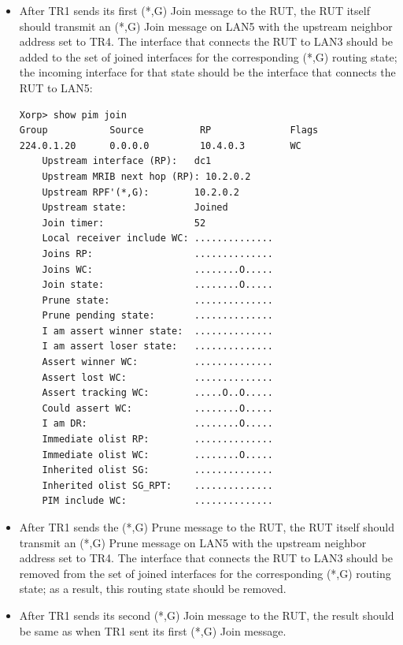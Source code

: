 \documentclass[11pt]{report}
\begin{document}


\begin{itemize}

  \item After TR1 sends its first (*,G) Join message to the RUT, the RUT
  itself should transmit an (*,G) Join message on LAN5 with the upstream
  neighbor address set to TR4. The interface that connects the RUT to LAN3
  should be added to the set of joined interfaces for the corresponding
  (*,G) routing state; the incoming interface for that state should be the
  interface that connects the RUT to LAN5:

\begin{verbatim}
Xorp> show pim join
Group           Source          RP              Flags
224.0.1.20      0.0.0.0         10.4.0.3        WC   
    Upstream interface (RP):   dc1
    Upstream MRIB next hop (RP): 10.2.0.2
    Upstream RPF'(*,G):        10.2.0.2
    Upstream state:            Joined 
    Join timer:                52
    Local receiver include WC: ..............
    Joins RP:                  ..............
    Joins WC:                  ........O.....
    Join state:                ........O.....
    Prune state:               ..............
    Prune pending state:       ..............
    I am assert winner state:  ..............
    I am assert loser state:   ..............
    Assert winner WC:          ..............
    Assert lost WC:            ..............
    Assert tracking WC:        .....O..O.....
    Could assert WC:           ........O.....
    I am DR:                   ........O.....
    Immediate olist RP:        ..............
    Immediate olist WC:        ........O.....
    Inherited olist SG:        ..............
    Inherited olist SG_RPT:    ..............
    PIM include WC:            ..............
\end{verbatim}

  \item After TR1 sends the (*,G) Prune message to the RUT, the RUT itself
  should transmit an (*,G) Prune message on LAN5 with the upstream neighbor
  address set to TR4. The interface that connects the RUT to LAN3 should be
  removed from the set of joined interfaces for the corresponding (*,G)
  routing state; as a result, this routing state should be removed.

  \item After TR1 sends its second (*,G) Join message to the RUT, the
  result should be same as when TR1 sent its first (*,G) Join message.


\end{itemize}
\end{document}
